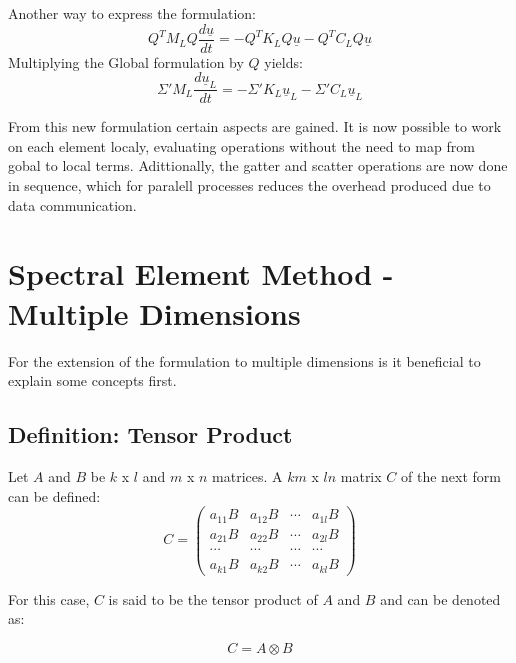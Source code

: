\documentclass[
]{scrartcl}
\begin{document}
Another way to express the formulation: \begin{equation}
         Q^{T}M_{L}Q\frac{d\underline{u}}{dt} = - Q^{T}K_LQ\underline{u} - Q^{T}C_LQ\underline{u}    
\end{equation} Multiplying the Global formulation by \(Q\) yields:
\begin{equation}
         \Sigma' M_{L}\frac{d\underline{u}_{L}}{dt} = - \Sigma'K_L\underline{u}_L - \Sigma'C_L\underline{u}_L    
\end{equation}

From this new formulation certain aspects are gained. It is now possible
to work on each element localy, evaluating operations without the need
to map from gobal to local terms. Adittionally, the gatter and scatter
operations are now done in sequence, which for paralell processes
reduces the overhead produced due to data communication.

\hypertarget{spectral-element-method---multiple-dimensions}{%
\section{Spectral Element Method - Multiple
Dimensions}\label{spectral-element-method---multiple-dimensions}}

For the extension of the formulation to multiple dimensions is it
beneficial to explain some concepts first.

\hypertarget{definition-tensor-product}{%
\subsection{Definition: Tensor
Product}\label{definition-tensor-product}}

Let \(A\) and \(B\) be \(k\) x \(l\) and \(m\) x \(n\) matrices. A
\(km\) x \(ln\) matrix \(C\) of the next form can be defined:
\begin{equation}
C=
\begin{pmatrix}
a_{11}B & a_{12}B & \cdots & a_{1l}B\\
a_{21}B & a_{22}B & \cdots & a_{2l}B\\
\cdots & \cdots & \cdots & \cdots\\
a_{k1}B & a_{k2}B & \cdots & a_{kl}B
\end{pmatrix}
\end{equation}

For this case, \(C\) is said to be the tensor product of \(A\) and \(B\)
and can be denoted as:

\begin{equation}
    C=A \otimes B
\end{equation}
\end{document}
